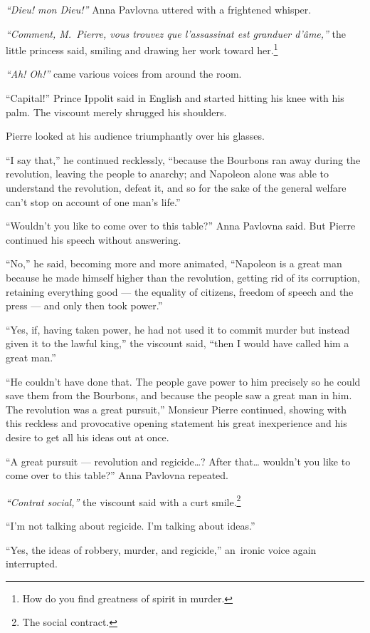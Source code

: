\textit{``Dieu! mon Dieu!''} Anna Pavlovna uttered with a frightened
whisper.

\textit{``Comment, M.~Pierre, vous trouvez que l'assassinat est
  granduer d'\^ame,''} the little princess said, smiling and drawing
her work toward her.\footnote{How do you find greatness of spirit in
  murder.}

\textit{``Ah! Oh!''} came various voices from around the room.

``Capital!'' Prince Ippolit said in English and started hitting his
knee with his palm. The viscount merely shrugged his shoulders.

Pierre looked at his audience triumphantly over his glasses.

``I say that,'' he continued recklessly, ``because the Bourbons ran
away during the revolution, leaving the people to anarchy; and
Napoleon alone was able to understand the revolution, defeat it, and
so for the sake of the general welfare can't stop on account of one
man's life.''

``Wouldn't you like to come over to this table?'' Anna Pavlovna
said. But Pierre continued his speech without answering.

``No,'' he said, becoming more and more animated, ``Napoleon is a
great man because he made himself higher than the revolution, getting
rid of its corruption, retaining everything good --- the equality of
citizens, freedom of speech and the press --- and only then took
power.''

``Yes, if, having taken power, he had not used it to commit murder but
instead given it to the lawful king,'' the viscount said, ``then I
would have called him a great man.''

``He couldn't have done that. The people gave power to him precisely
so he could save them from the Bourbons, and because the people saw a
great man in him. The revolution was a great pursuit,'' Monsieur
Pierre continued, showing with this reckless and provocative opening
statement his great inexperience and his desire to get all his ideas
out at once.

``A great pursuit --- revolution and regicide\ldots{}? After
that\ldots{} wouldn't you like to come over to this table?'' Anna
Pavlovna repeated.

\textit{``Contrat social,''} the viscount said with a curt
smile.\footnote{The social contract.}

``I'm not talking about regicide. I'm talking about ideas.''

``Yes, the ideas of robbery, murder, and regicide,'' an\ ironic voice
again interrupted.

